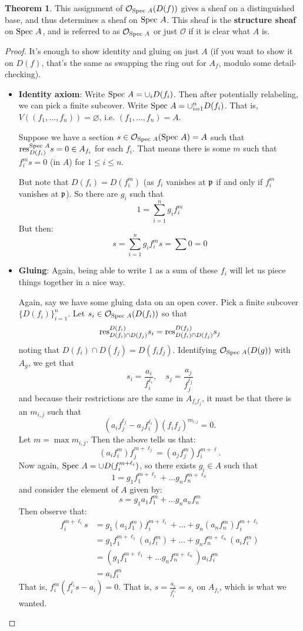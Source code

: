 \documentclass[10pt,reqno]{amsart}
\theoremstyle{definition}
\newtheorem{theorem}{Theorem}
\theoremstyle{remark}
\numberwithin{equation}{section}
\numberwithin{theorem}{section}
\newcommand{\OO}{{\mathcal O}}
\newcommand{\res}{\textup{res}}
\newcommand{\spec}{\textup{Spec }}
\newcommand{\pp}{\frak{p}}
\begin{document}
 \begin{theorem} This assignment of $\OO_{\spec A}(D(f))$ gives a sheaf on a distinguished base, and thus determines a sheaf on $\spec A$. This sheaf is the \textbf{structure sheaf} on $\spec A$, and is referred to as $\OO_{\spec A}$ or just $\OO$ if it is clear what $A$ is.
 \end{theorem}
 \begin{proof} It's enough to show identity and gluing on just $A$ (if you want to show it on $D(f)$, that's the same as swapping the ring out for $A_f$, modulo some detail-checking).
 \begin{itemize}
 \item \textbf{Identity axiom}: Write $\spec A = \cup_i D(f_i)$. Then after potentially relabeling, we can pick a finite subcover. Write $\spec A = \cup_{i=1}^n D(f_i)$. That is, $V((f_1,\dots,f_n)) = \varnothing$, i.e. $(f_1,\dots,f_n) = A$.
 
 Suppose we have a section $s \in \OO_{\spec A}(\spec A) = A$ such that $\res^{\spec A}_{D(f_i)} s= 0 \in A_{f_i}$ for each $f_i$. That means there is some $m$ such that $f_i^m s = 0$ (in $A$) for $1 \le i \le n$. 
 
 But note that $D(f_i) = D(f_i^m)$ (as $f_i$ vanishes at $\pp$ if and only if $f_i^m$ vanishes at $\pp$). So there are $g_i$ such that 
 \[1 = \sum_{i=1}^n g_i f_i^m\]
 But then:
 \[s = \sum_{i=1}^n g_i f_i^m s = \sum 0 = 0\]
 \item \textbf{Gluing}: Again, being able to write $1$ as a sum of these $f_i$ will let us piece things together in a nice way.
 
 Again, say we have some gluing data on an open cover. Pick a finite subcover $\{D(f_i)\}_{i=1}^n$. Let $s_i \in \OO_{\spec A}(D(f_i))$ so that
 \[\res^{D(f_i)}_{D(f_i) \cap D(f_j)} s_i = \res^{D(f_j)}_{D(f_i) \cap D(f_j)} s_j \]
 noting that $D(f_i) \cap D(f_j) = D(f_if_j)$. Identifying $\OO_{\spec A}(D(g))$ with $A_g$, we get that 
 \[s_i = \frac{a_i}{f_i^{\ell_i}}, \quad s_j = \frac{a_j}{f_j^{\ell_j}}\]
 and because their restrictions are the same in $A_{f_if_j}$, it must be that there is an $m_{i,j}$ such that
 \[(a_if_j^{\ell_j} - a_j f_i^{\ell_i})(f_i f_j)^{m_{i,j}} = 0.\]
 Let $m = \max m_{i,j}$. Then the above tells us that:
 \[(a_i f_i^m) f_j^{m + \ell_j} = (a_j f_j^m) f_i^{m + \ell}.\]
 Now again, $\spec A = \cup D(f_i^{m + \ell_i})$, so there exists $g_i \in A$ such that
 \[1 = g_1f_1^{m+ \ell_1} + \dots g_n f_n^{m+\ell_n}\]
 and consider the element of $A$ given by:
 \[s = g_1a_1f_1^{m} + \dots g_n a_nf_n^{m}\]
 Then observe that:
 \begin{align*}
 f_i^{m+\ell_i} s &= g_1(a_1 f_1^m)f_i^{m+\ell_i} + \dots + g_n(a_n f_n^m)f_i^{m+\ell_i}\\
 &= g_1f_1^{m+\ell_1}(a_if_i^m) + \dots + g_n f_n^{m+\ell_n}(a_if_i^m)\\
 &= ( g_1f_1^{m+ \ell_1} + \dots g_n f_n^{m+\ell_n})a_i f_i^m\\
 &= a_i f_i^m
 \end{align*}
 That is, $f_i^m(f_i^{\ell_i}s - a_i) = 0$. That is, $s = \frac{a_i}{f_i^{\ell_i}} = s_i$ on $A_{f_i}$, which is what we wanted.
 

\end{itemize}
\end{proof}
\end{document}
